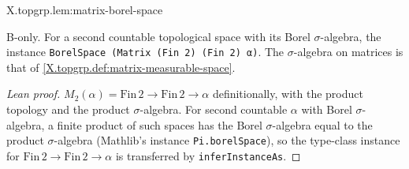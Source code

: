 \begin{lemma}
\bonly
{}
\end{lemma}
\begin{tfformal}{X.topgrp.lem:matrix-borel-space}
\begin{tffidelity}
B-only. For a second countable topological space with its Borel $\sigma$-algebra, the instance \texttt{BorelSpace (Matrix (Fin 2) (Fin 2) α)}. The $\sigma$-algebra on matrices is that of \cref{X.topgrp.def:matrix-measurable-space}.
\end{tffidelity}
\end{tfformal}
\begin{proof}[Lean proof]
$M_2(\alpha)=\mathrm{Fin}\,2\to\mathrm{Fin}\,2\to\alpha$ definitionally, with the product topology and the product $\sigma$-algebra. For second countable $\alpha$ with Borel $\sigma$-algebra, a finite product of such spaces has the Borel $\sigma$-algebra equal to the product $\sigma$-algebra (Mathlib's instance \texttt{Pi.borelSpace}), so the type-class instance for $\mathrm{Fin}\,2\to\mathrm{Fin}\,2\to\alpha$ is transferred by \texttt{inferInstanceAs}.
\end{proof}

